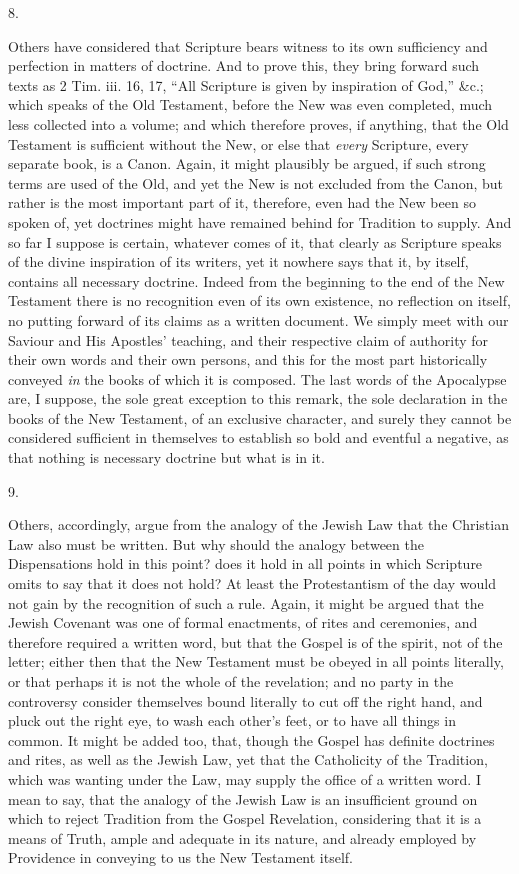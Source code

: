 8.

Others have considered that Scripture bears witness to its own
sufficiency and perfection in matters of doctrine. And to prove this,
they bring forward such texts as 2 Tim. iii. 16, 17, ``All
Scripture is given by inspiration of God,'' \&c.; which speaks
of the Old Testament, before the New was even completed, much less
collected into a volume; and which therefore proves, if anything, that
the Old Testament is sufficient without the New, or else that \emph{every}
Scripture, every separate book, is a Canon. Again, it might plausibly
be argued, if such strong terms are used of the Old, and yet the New
is not excluded from the Canon, but rather is the most important part
of it, therefore, even had the New been so spoken of, yet doctrines
might have remained behind for Tradition to supply. And so far I
suppose is certain, whatever comes of it, that clearly as Scripture
speaks of the divine inspiration of its writers, yet it nowhere says
that it, by itself, contains all necessary doctrine. Indeed from the
beginning to the end of the New Testament there is no recognition even
of its own existence, no reflection on itself, no putting forward of
its claims as a written document. We simply meet with our Saviour and
His Apostles' teaching, and their respective claim of authority for
their own words and their own persons, and this for the most part
historically conveyed \emph{in} the books of which it is composed. The last
words of the Apocalypse are, I suppose, the sole great exception to
this remark, the sole declaration in the books of the New Testament,
of an exclusive character, and surely they cannot be considered
sufficient in themselves to establish so bold and eventful a negative,
as that nothing is necessary doctrine but what is in it.

9.

Others, accordingly, argue from the analogy of the Jewish Law that
the Christian Law also must be written. But why should the analogy
between the Dispensations hold in this point? does it hold in all
points in which Scripture omits to say that it does not hold? At least
the Protestantism of the day would not gain by the recognition of such
a rule. Again, it might be argued that the Jewish Covenant was one of
formal enactments, of rites and ceremonies, and therefore required a
written word, but that the Gospel is of the spirit, not of the letter;
either then that the New Testament must be obeyed in all points
literally, or that perhaps it is not the whole of the revelation; and
no party in the controversy consider themselves bound literally to cut
off the right hand, and pluck out the right eye, to wash each other's
feet, or to have all things in common. It might be added too, that,
though the Gospel has definite doctrines and rites, as well as the
Jewish Law, yet that the Catholicity of the Tradition, which was
wanting under the Law, may supply the office of a written word. I mean
to say, that the analogy of the Jewish Law is an insufficient ground
on which to reject Tradition from the Gospel Revelation, considering
that it is a means of Truth, ample and adequate in its nature, and
already employed by Providence in conveying to us the New Testament
itself.

